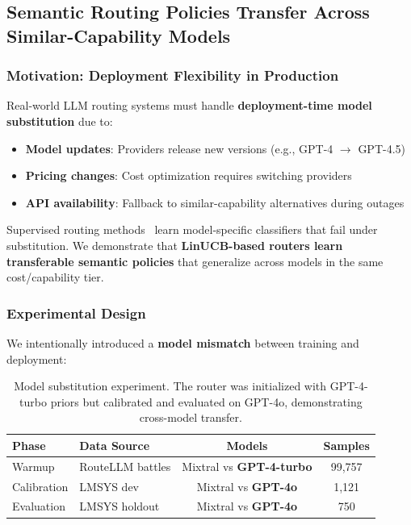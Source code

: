 
\subsection{Semantic Routing Policies Transfer Across Similar-Capability Models}
\label{sec:model_transfer}

\subsubsection{Motivation: Deployment Flexibility in Production}

Real-world LLM routing systems must handle \textbf{deployment-time model substitution} due to:
\begin{itemize}
    \item \textbf{Model updates}: Providers release new versions (e.g., GPT-4 $\to$ GPT-4.5)
    \item \textbf{Pricing changes}: Cost optimization requires switching providers
    \item \textbf{API availability}: Fallback to similar-capability alternatives during outages
\end{itemize}

Supervised routing methods~\cite{ong2024routellm} learn model-specific classifiers that fail under substitution. We demonstrate that \textbf{LinUCB-based routers learn transferable semantic policies} that generalize across models in the same cost/capability tier.

\subsubsection{Experimental Design}

We intentionally introduced a \textbf{model mismatch} between training and deployment:

\begin{table}[h]
\centering
\small
\begin{tabular}{@{}llcc@{}}
\toprule
\textbf{Phase} & \textbf{Data Source} & \textbf{Models} & \textbf{Samples} \\ \midrule
Warmup & RouteLLM battles & Mixtral vs \textbf{GPT-4-turbo} & 99,757 \\
Calibration & LMSYS dev & Mixtral vs \textbf{GPT-4o} & 1,121 \\
Evaluation & LMSYS holdout & Mixtral vs \textbf{GPT-4o} & 750 \\
\bottomrule
\end{tabular}
\caption{Model substitution experiment. The router was initialized with GPT-4-turbo priors but calibrated and evaluated on GPT-4o, demonstrating cross-model transfer.}
\label{tab:model_transfer_setup}
\end{table}

